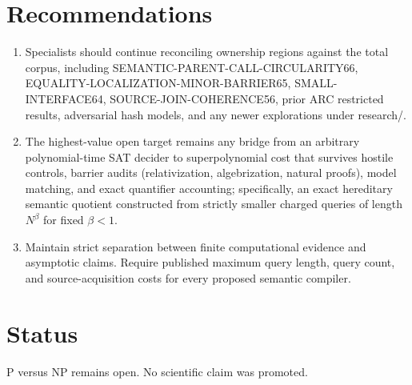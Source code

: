 \documentclass[11pt]{article}
\begin{document}
\section{Recommendations}
\begin{enumerate}
\item Specialists should continue reconciling ownership regions against the total corpus, including SEMANTIC-PARENT-CALL-CIRCULARITY66, EQUALITY-LOCALIZATION-MINOR-BARRIER65, SMALL-INTERFACE64, SOURCE-JOIN-COHERENCE56, prior ARC restricted results, adversarial hash models, and any newer explorations under research/.
\item The highest-value open target remains any bridge from an arbitrary polynomial-time SAT decider to superpolynomial cost that survives hostile controls, barrier audits (relativization, algebrization, natural proofs), model matching, and exact quantifier accounting; specifically, an exact hereditary semantic quotient constructed from strictly smaller charged queries of length $N^\beta$ for fixed $\beta<1$.
\item Maintain strict separation between finite computational evidence and asymptotic claims. Require published maximum query length, query count, and source-acquisition costs for every proposed semantic compiler.
\end{enumerate}

\section{Status}
P versus NP remains open. No scientific claim was promoted.

\end{document}
